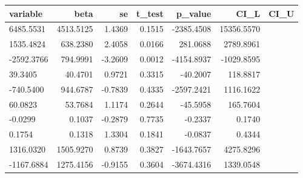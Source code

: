 

\begin{tabular}{lrrrrrr}
	\hline
	variable & beta & se & t\_test & p\_value & CI\_L & CI\_U \\ 
	\hline
6485.5531 & 4513.5125 & 1.4369 & 0.1515 & -2385.4508 & 15356.5570 \\
1535.4824 & 638.2380 & 2.4058 & 0.0166 & 281.0688 & 2789.8961 \\
-2592.3766 & 794.9991 & -3.2609 & 0.0012 & -4154.8937 & -1029.8595 \\
39.3405 & 40.4701 & 0.9721 & 0.3315 & -40.2007 & 118.8817 \\
-740.5400 & 944.6787 & -0.7839 & 0.4335 & -2597.2421 & 1116.1622 \\
60.0823 & 53.7684 & 1.1174 & 0.2644 & -45.5958 & 165.7604 \\
-0.0299 & 0.1037 & -0.2879 & 0.7735 & -0.2337 & 0.1740 \\
0.1754 & 0.1318 & 1.3304 & 0.1841 & -0.0837 & 0.4344 \\
1316.0320 & 1505.9270 & 0.8739 & 0.3827 & -1643.7657 & 4275.8296 \\
-1167.6884 & 1275.4156 & -0.9155 & 0.3604 & -3674.4316 & 1339.0548 \\

   \hline
\end{tabular}

